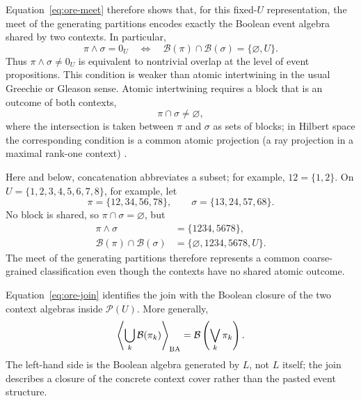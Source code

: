\documentclass[aps,pra,reprint,nofootinbib]{revtex4-2}
\newcommand{\Pow}{\mathcal{P}}
\newcommand{\BA}{\mathcal{B}}
\begin{document}
Equation~\eqref{eq:ore-meet} therefore shows that, for this fixed-$U$
representation, the meet of the generating partitions encodes exactly the
Boolean event algebra shared by two contexts.  In particular,
\begin{equation}
  \pi\wedge\sigma=0_U
  \quad\Longleftrightarrow\quad
  \BA(\pi)\cap\BA(\sigma)=\{\varnothing,U\}.
  \label{eq:no-boolean-overlap}
\end{equation}
Thus $\pi\wedge\sigma\ne0_U$ is equivalent to nontrivial overlap at the
  level of event propositions.  This condition is weaker than atomic
  intertwining in the usual Greechie or Gleason sense.  Atomic intertwining
  requires a block that is an outcome of both contexts,
\begin{equation}
  \pi\cap\sigma\ne\varnothing,
  \label{eq:atomic-intertwining}
  \end{equation}
  where the intersection is taken between $\pi$ and $\sigma$ as sets of blocks;
  in Hilbert space the corresponding condition is a common atomic projection
  (a ray projection in a maximal rank-one context)
  \cite{svozil-2018-b}.

  Here and below, concatenation abbreviates a subset; for example,
  $12=\{1,2\}$.  On $U=\{1,2,3,4,5,6,7,8\}$, for example, let
\begin{equation}
  \pi=\{12,34,56,78\},\qquad
  \sigma=\{13,24,57,68\}.
  \label{eq:overlap-without-shared-atom}
\end{equation}
No block is shared, so $\pi\cap\sigma=\varnothing$, but
\begin{align}
  \pi\wedge\sigma&=\{1234,5678\},\nonumber\\
  \BA(\pi)\cap\BA(\sigma)
  &=\{\varnothing,1234,5678,U\}.
  \label{eq:coarse-common-algebra}
\end{align}
The meet of the generating partitions therefore represents a common
coarse-grained classification even though the contexts have no shared atomic
outcome.

Equation~\eqref{eq:ore-join} identifies the join with the Boolean closure of
the two context algebras inside $\Pow(U)$.  More generally,
\begin{equation}
  \left\langle\bigcup_k\BA(\pi_k)\right\rangle_{\rm BA}
  =\BA\left(\bigvee_k\pi_k\right).
  \label{eq:family-hull}
\end{equation}
The left-hand side is the Boolean algebra generated by $L$, not $L$ itself;
the join describes a closure of the concrete context cover rather than the
pasted event structure.
\end{document}
